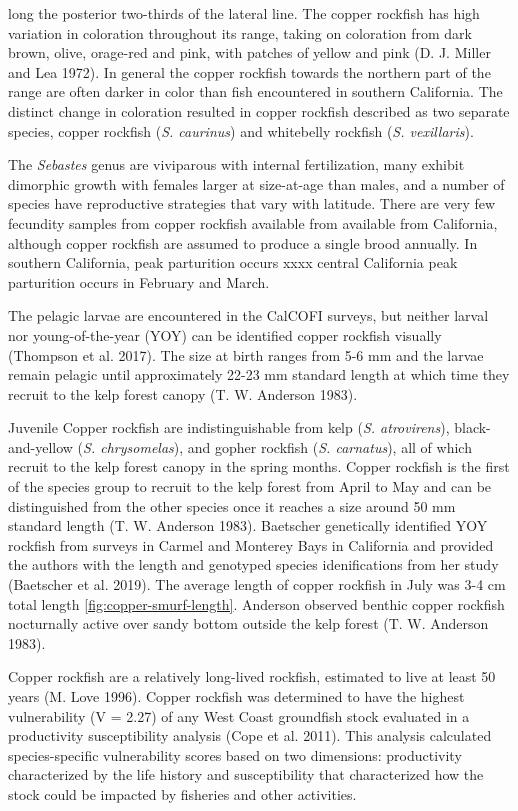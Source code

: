 \documentclass[11pt,
  english,
  letterpaper,
]{article}
\begin{document}
long the posterior two-thirds of the lateral line. The copper rockfish has high variation in coloration throughout its range, taking on coloration from dark brown, olive, orage-red and pink, with patches of yellow and pink (D. J. Miller and Lea 1972). In general the copper rockfish towards the northern part of the range are often darker in color than fish encountered in southern California. The distinct change in coloration resulted in copper rockfish described as two separate species, copper rockfish (\emph{S. caurinus}) and whitebelly rockfish (\emph{S. vexillaris}).

The \emph{Sebastes} genus are viviparous with internal fertilization, many exhibit dimorphic growth with females larger at size-at-age than males, and a number of species have reproductive strategies that vary with latitude. There are very few fecundity samples from copper rockfish available from available from California, although copper rockfish are assumed to produce a single brood annually. In southern California, peak parturition occurs xxxx central California peak parturition occurs in February and March.

The pelagic larvae are encountered in the CalCOFI surveys, but neither larval nor young-of-the-year (YOY) can be identified copper rockfish visually (Thompson et al. 2017). The size at birth ranges from 5-6 mm and the larvae remain pelagic until approximately 22-23 mm standard length at which time they recruit to the kelp forest canopy (T. W. Anderson 1983).

Juvenile Copper rockfish are indistinguishable from kelp (\emph{S. atrovirens}), black-and-yellow (\emph{S. chrysomelas}), and gopher rockfish (\emph{S. carnatus}), all of which recruit to the kelp forest canopy in the spring months. Copper rockfish is the first of the species group to recruit to the kelp forest from April to May and can be distinguished from the other species once it reaches a size around 50 mm standard length (T. W. Anderson 1983). Baetscher genetically identified YOY rockfish from surveys in Carmel and Monterey Bays in California and provided the authors with the length and genotyped species idenifications from her study (Baetscher et al. 2019). The average length of copper rockfish in July was 3-4 cm total length \ref{fig:copper-smurf-length}. Anderson observed benthic copper rockfish nocturnally active over sandy bottom outside the kelp forest (T. W. Anderson 1983).

Copper rockfish are a relatively long-lived rockfish, estimated to live at least 50 years (M. Love 1996). Copper rockfish was determined to have the highest vulnerability (V = 2.27) of any West Coast groundfish stock evaluated in a productivity susceptibility analysis (Cope et al. 2011). This analysis calculated species-specific vulnerability scores based on two dimensions: productivity characterized by the life history and susceptibility that characterized how the stock could be impacted by fisheries and other activities.
\end{document}
